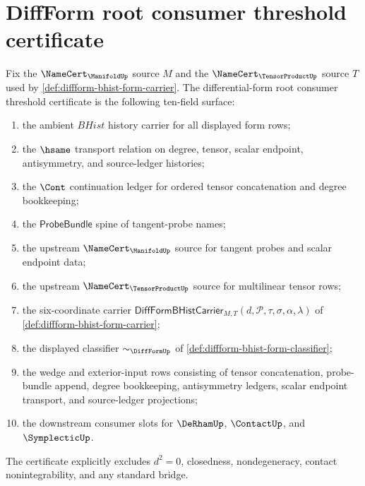 \section{DiffForm root consumer threshold certificate}
\label{sec:diffform-root-consumer-threshold-certificate}

\begin{definition}
\label{def:diffform-root-consumer-threshold-certificate}
Fix the $\NameCert_{\ManifoldUp}$ source $M$ and the
$\NameCert_{\TensorProductUp}$ source $T$ used by
\autoref{def:diffform-bhist-form-carrier}. The differential-form root
consumer threshold certificate is the following ten-field surface:
\begin{enumerate}
  \item the ambient $BHist$ history carrier for all displayed form rows;
  \item the $\hsame$ transport relation on degree, tensor, scalar endpoint,
  antisymmetry, and source-ledger histories;
  \item the $\Cont$ continuation ledger for ordered tensor concatenation and
  degree bookkeeping;
  \item the $\mathsf{ProbeBundle}$ spine of tangent-probe names;
  \item the upstream $\NameCert_{\ManifoldUp}$ source for tangent probes and
  scalar endpoint data;
  \item the upstream $\NameCert_{\TensorProductUp}$ source for multilinear
  tensor rows;
  \item the six-coordinate carrier
  $\mathsf{DiffFormBHistCarrier}_{M,T}(d,\mathcal{P},\tau,\sigma,\alpha,\lambda)$
  of \autoref{def:diffform-bhist-form-carrier};
  \item the displayed classifier $\sim_{\DiffFormUp}$ of
  \autoref{def:diffform-bhist-form-classifier};
  \item the wedge and exterior-input rows consisting of tensor concatenation,
  probe-bundle append, degree bookkeeping, antisymmetry ledgers, scalar
  endpoint transport, and source-ledger projections;
  \item the downstream consumer slots for $\DeRhamUp$, $\ContactUp$, and
  $\SymplecticUp$.
\end{enumerate}
The certificate explicitly excludes $d^2=0$, closedness, nondegeneracy,
contact nonintegrability, and any standard bridge.
\end{definition}

